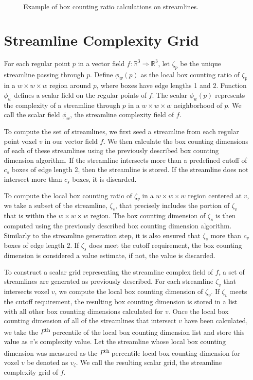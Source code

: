 \documentclass[journal]{vgtc}                %
\newcommand {\emath}[1]  {\ensuremath{#1}}
\newcommand {\Real}[1]   {\emath{\mathbb{R}^{#1}}}   %
\newcommand {\Rthree}    {\Real{3}}                  %
\newcommand {\gDim}[1]   {\emath{#1 \times #1 \times #1}} %
\begin{document}
\begin{figure}[t]
\begin{minipage}{0.47\linewidth}
		\end{minipage}
	\caption{Example of box counting ratio calculations on streamlines.}
	\label{fig:box_counting_calcs}
\end{figure}

\section{Streamline Complexity Grid}

For each regular point $p$ in a vector field $f: \Rthree \Rightarrow \Rthree$,
let $\zeta_p$ be the unique streamline passing through $p$.
Define $\phi_w(p)$ as the local box counting ratio of $\zeta_p$
in a $\gDim{w}$ region around $p$,
where boxes have edge lengths 1 and 2.
Function $\phi_w$ defines a scalar field on the regular points of $f$.
The scalar $\phi_w(p)$ represents the complexity of a streamline through $p$ in a $\gDim{w}$ neighborhood of $p$.
We call the scalar field $\phi_w$, the streamline complexity field of $f$.

To compute the set of streamlines, we first seed a streamline from each regular point voxel $v$ in our vector field $f$.
We then calculate the box counting dimensions of each of these streamlines using the previously described box counting dimension algorithm.
If the streamline intersects more than a predefined cutoff of $c_s$ boxes of edge length 2, then the streamline is stored.
If the streamline does not intersect more than $c_s$ boxes, it is discarded.

To compute the local box counting ratio of $\zeta_v$ in a $\gDim{w}$ region centered at $v$, we take a subset of the streamline, $\zeta_s$, that precisely includes the portion of $\zeta_v$ that is within the $\gDim{w}$ region.
The box counting dimension of $\zeta_s$ is then computed using the previously described box counting dimension algorithm.
Similarly to the streamline generation step, it is also ensured that $\zeta_s$ more than $c_v$ boxes of edge length 2.
If $\zeta_s$ does meet the cutoff requirement, the box counting dimension is considered a value estimate, if not, the value is discarded.

To construct a scalar grid representing the streamline complex field of $f$, a set of streamlines are generated as previously described.
For each streamline $\zeta_v$ that intersects voxel $v$, we compute the local box counting dimension of $\zeta_v$.
If $\zeta_v$ meets the cutoff requirement, the resulting box counting dimension is stored in a list with all other box counting dimensions calculated for $v$.
Once the local box counting dimension of all of the streamlines that intersect $v$ have been calculated, we take the $P$\textsuperscript{th} percentile of the local box counting dimension list and store this value as $v$'s complexity value.
Let the streamline whose local box counting dimension was measured as the $P$\textsuperscript{th} percentile local box counting dimension for voxel $v$ be denoted as $v_\zeta$.
We call the resulting scalar grid, the streamline complexity grid of $f$.
\end{document}
